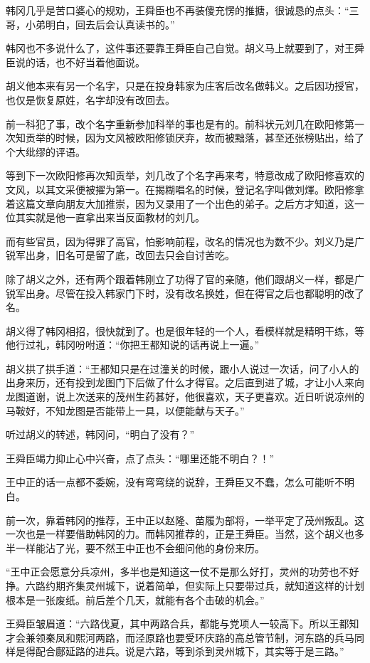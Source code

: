 韩冈几乎是苦口婆心的规劝，王舜臣也不再装傻充愣的推搪，很诚恳的点头：“三哥，小弟明白，回去后会认真读书的。”

韩冈也不多说什么了，这件事还要靠王舜臣自己自觉。胡义马上就要到了，对王舜臣说的话，也不好当着他面说。

胡义他本来有另一个名字，只是在投身韩家为庄客后改名做韩义。之后因功授官，也仅是恢复原姓，名字却没有改回去。

前一科犯了事，改个名字重新参加科举的事也是有的。前科状元刘几在欧阳修第一次知贡举的时候，因为文风被欧阳修锁厌弃，故而被黜落，甚至还张榜贴出，给了个大纰缪的评语。

等到下一次欧阳修再次知贡举，刘几改了个名字再来考，特意改成了欧阳修喜欢的文风，以其文采便被擢为第一。在揭糊唱名的时候，登记名字叫做刘煇。欧阳修拿着这篇文章向朋友大加推崇，因为又录用了一个出色的弟子。之后方才知道，这一位其实就是他一直拿出来当反面教材的刘几。

而有些官员，因为得罪了高官，怕影响前程，改名的情况也为数不少。刘义乃是广锐军出身，旧名可是留了底，改回去只会自讨苦吃。

除了胡义之外，还有两个跟着韩刚立了功得了官的亲随，他们跟胡义一样，都是广锐军出身。尽管在投入韩家门下时，没有改名换姓，但在得官之后也都聪明的改了名。

胡义得了韩冈相招，很快就到了。也是很年轻的一个人，看模样就是精明干练，等他行过礼，韩冈吩咐道：“你把王都知说的话再说上一遍。”

胡义拱了拱手道：“王都知只是在过潼关的时候，跟小人说过一次话，问了小人的出身来历，还有投到龙图门下后做了什么才得官。之后直到进了城，才让小人来向龙图道谢，说上次送来的茂州生药甚好，他很喜欢，天子更喜欢。近日听说凉州的马鞍好，不知龙图是否能带上一具，以便能献与天子。”

听过胡义的转述，韩冈问，“明白了没有？”

王舜臣竭力抑止心中兴奋，点了点头：“哪里还能不明白？！”

王中正的话一点都不委婉，没有弯弯绕的说辞，王舜臣又不蠢，怎么可能听不明白。

前一次，靠着韩冈的推荐，王中正以赵隆、苗履为部将，一举平定了茂州叛乱。这一次也是一样要借助韩冈的力。而韩冈推荐的，正是王舜臣。当然，这个胡义也多半一样能沾了光，要不然王中正也不会细问他的身份来历。

“王中正会愿意分兵凉州，多半也是知道这一仗不是那么好打，灵州的功劳也不好挣。六路约期齐集灵州城下，说着简单，但实际上只要带过兵，就知道这样的计划根本是一张废纸。前后差个几天，就能有各个击破的机会。”

王舜臣皱眉道：“六路伐夏，其中两路合兵，都能与党项人一较高下。所以王都知才会兼领秦凤和熙河两路，而泾原路也要受环庆路的高总管节制，河东路的兵马同样是得配合鄜延路的进兵。说是六路，等到杀到灵州城下，其实等于是三路。”

